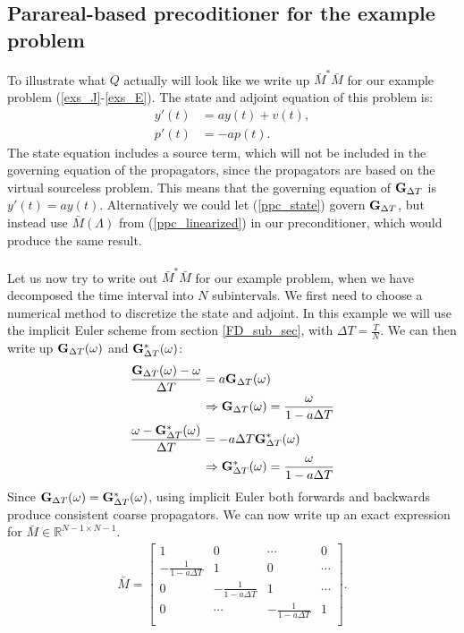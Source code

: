 \subsection{Parareal-based precoditioner for the example problem}
To illustrate what $Q$ actually will look like we write up $\bar M^*\bar M$ for our example problem (\ref{exs_J}-\ref{exs_E}). The state and adjoint equation of this problem is:
\begin{align}
y'(t) &= ay(t) + v(t), \label{ppc_state} \\
p'(t) &= -ap(t). \label{ppc_adjoint}
\end{align}
The state equation includes a source term, which will not be included in the governing equation of the propagators, since the propagators are based on the virtual sourceless problem. This means that the governing equation of $\bold G_{\Delta T}$ is $y'(t) = ay(t)$. Alternatively we could let (\ref{ppc_state}) govern $\bold G_{\Delta T}$, but instead use $\bar M(\Lambda)$ from (\ref{ppc_linearized}) in our preconditioner, which would produce the same result. 
\\
\\
Let us now try to write out $\bar M^*\bar M$ for our example problem, when we have decomposed the time interval into $N$ subintervals. We first need to choose a numerical method to discretize the state and adjoint. In this example we will use the implicit Euler scheme from section \ref{FD_sub_sec}, with $\Delta T=\frac{T}{N}$. We can then write up $\bold G_{\Delta T}(\omega)$ and $\bold G_{\Delta T}^*(\omega)$:
\begin{align}
\frac{\bold G_{\Delta T}(\omega)-\omega}{\Delta T}&=  a\bold G_{\Delta T}(\omega) \\
&\Rightarrow \bold G_{\Delta T}(\omega)= \frac{\omega}{1-a\Delta T} \\
\frac{\omega-\bold G_{\Delta T}^*(\omega)}{\Delta T}&= -a\Delta T \bold G_{\Delta T}^*(\omega) \\
&\Rightarrow \bold G_{\Delta T}^*(\omega)= \frac{\omega}{1-a\Delta T} \label{ImplicitEG}
\end{align}
Since $\bold G_{\Delta T}(\omega)= \bold G_{\Delta T}^*(\omega)$, using implicit Euler both forwards and backwards produce consistent coarse propagators. We can now write up an exact expression for $\bar M\in\mathbb{R}^{N-1\times N-1}$. 
\begin{align*}
\bar M = \left[ \begin{array}{cccc}
   	1 & 0 & \cdots & 0 \\  
   	-\frac{1}{1-a\Delta T} & 1 & 0 & \cdots \\ 
   	0 &-\frac{1}{1-a\Delta T} & 1  & \cdots \\
   	0 &\cdots &-\frac{1}{1-a\Delta T} & 1  \\
  	\end{array}  \right].
\end{align*}
